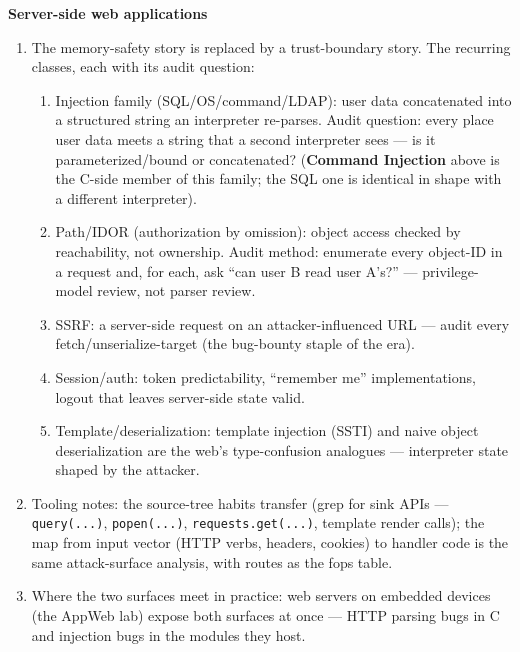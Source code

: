\documentclass[12pt]{Training}
\begin{document}
\textbf{Server-side web applications}
\begin{enumerate}
    \item The memory-safety story is replaced by a trust-boundary story. The recurring classes, each with its audit question:
    \begin{enumerate}
        \item Injection family (SQL/OS/command/LDAP): user data concatenated into a structured string an interpreter re-parses. Audit question: every place user data meets a string that a second interpreter sees --- is it parameterized/bound or concatenated? (\textbf{Command Injection} above is the C-side member of this family; the SQL one is identical in shape with a different interpreter).
        \item Path/IDOR (authorization by omission): object access checked by reachability, not ownership. Audit method: enumerate every object-ID in a request and, for each, ask ``can user B read user A's?'' --- privilege-model review, not parser review.
        \item SSRF: a server-side request on an attacker-influenced URL --- audit every fetch/unserialize-target (the bug-bounty staple of the era).
        \item Session/auth: token predictability, ``remember me'' implementations, logout that leaves server-side state valid.
        \item Template/deserialization: template injection (SSTI) and naive object deserialization are the web's type-confusion analogues --- interpreter state shaped by the attacker.
    \end{enumerate}
    \item Tooling notes: the source-tree habits transfer (grep for sink APIs --- \lstinline{query(...)}, \lstinline{popen(...)}, \lstinline{requests.get(...)}, template render calls); the map from input vector (HTTP verbs, headers, cookies) to handler code is the same attack-surface analysis, with routes as the fops table.
    \item Where the two surfaces meet in practice: web servers on embedded devices (the AppWeb lab) expose both surfaces at once --- HTTP parsing bugs in C and injection bugs in the modules they host.
\end{enumerate}
\end{document}
